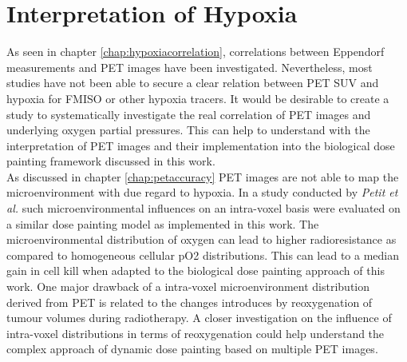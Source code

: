 \section{Interpretation of Hypoxia}
As seen in chapter \ref{chap:hypoxiacorrelation}, correlations between Eppendorf measurements and PET images have been investigated. Nevertheless, most studies have not been able to secure a clear relation between PET SUV and hypoxia for FMISO or other hypoxia tracers. It would be desirable to create a study to systematically investigate the real correlation of PET images and underlying oxygen partial pressures. This can help to understand with the interpretation of PET images and their implementation into the biological dose painting framework discussed in this work.\\As discussed in chapter \ref{chap:petaccuracy} PET images are not able to map the microenvironment with due regard to hypoxia. In a study conducted by \textit{Petit et al.}\cite{pmid19293465} such microenvironmental influences on an intra-voxel basis were evaluated on a similar dose painting model as implemented in this work. The microenvironmental distribution of oxygen can lead to higher radioresistance as compared to homogeneous cellular pO2 distributions. This can lead to a median gain in cell kill when adapted to the biological dose painting approach of this work. One major drawback of a intra-voxel microenvironment distribution derived from PET is related to the changes introduces by reoxygenation of tumour volumes during radiotherapy. A closer investigation on the influence of intra-voxel distributions in terms of reoxygenation could help understand the complex approach of dynamic dose painting based on multiple PET images.
